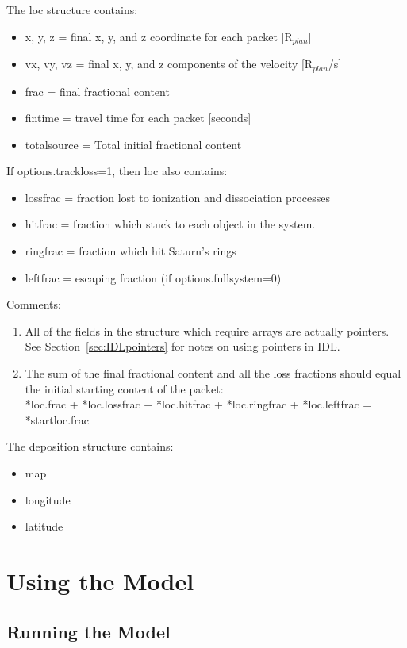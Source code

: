 \documentclass[11pt]{article}
\begin{document}
The loc structure contains:
\begin{itemize}
\item x, y, z = final x, y, and z coordinate for each packet [R$_{plan}$]
\item vx, vy, vz = final x, y, and z components of the velocity [R$_{plan}$/s]
\item frac = final fractional content
\item fintime = travel time for each packet [seconds]
\item totalsource = Total initial fractional content
\end{itemize}
If options.trackloss=1, then loc also contains:
\begin{itemize}
\item lossfrac = fraction lost to ionization and dissociation processes
\item hitfrac = fraction which stuck to each object in the system.
\item ringfrac = fraction which hit Saturn's rings
\item leftfrac = escaping fraction (if options.fullsystem=0)
\end{itemize}

Comments:
\begin{enumerate}
\item All of the fields in the structure which require arrays are actually
pointers. See Section~\ref{sec:IDLpointers} for notes on using pointers in IDL.
\item The sum of the final fractional content and all the loss fractions should
equal the initial starting content of the packet: \\
*loc.frac + *loc.lossfrac + *loc.hitfrac + *loc.ringfrac + *loc.leftfrac  =
*startloc.frac
\end{enumerate}

The deposition structure contains:
\begin{itemize}
\item map 
\item longitude
\item latitude
\end{itemize}

\section{Using the Model}

\subsection{Running the Model}
\end{document}
